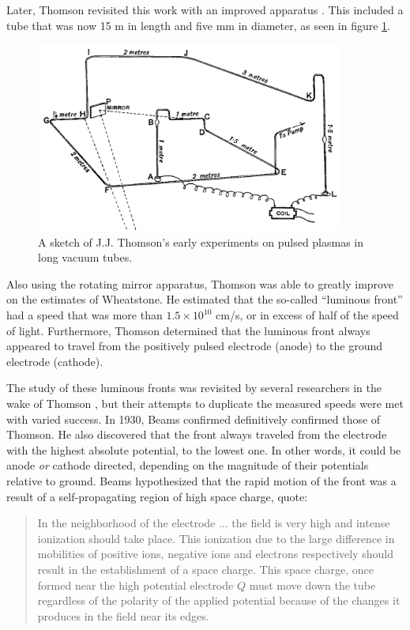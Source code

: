 Later, Thomson revisited this work with an improved apparatus
\cite{Thomson1893}. This included a tube that was now 15 m in length and five mm
in diameter, as seen in figure \ref{fig:thomson}.
\begin{figure}
  \centering
  \includegraphics[width=4in]{chapters/introduction/figures/thomson.png}
  \caption{A sketch of J.J. Thomson's early experiments on pulsed plasmas 
  in long vacuum tubes.}\label{fig:thomson}
\end{figure}
Also using the rotating mirror apparatus, Thomson was able to greatly improve on
the estimates of Wheatstone. He estimated that the so-called ``luminous front''
had a speed that was more than $1.5\times10^{10}$ cm/s, or in excess of half of
the speed of light. Furthermore, Thomson determined that the luminous front
always appeared to travel from the positively pulsed electrode (anode) to the
ground electrode (cathode).

The study of these luminous fronts was revisited by several researchers in the
wake of Thomson \cite{James1904, Whiddington1925, Beams1926}, but their attempts
to duplicate the measured speeds were met with varied success. In 1930, Beams
confirmed definitively confirmed those of Thomson. He also discovered that the
front always traveled from the electrode with the highest absolute potential, to
the lowest one. In other words, it could be anode \emph{or} cathode directed,
depending on the magnitude of their potentials relative to ground. Beams
hypothesized that the rapid motion of the front was a result of a
self-propagating region of high space charge, quote:
\begin{quote}
  In the neighborhood of the electrode $\ldots{}$ the field is very high and
  intense ionization should take place. This ionization due to the large
  difference in mobilities of positive ions, negative ions and electrons
  respectively should result in the establishment of a space charge. This space
  charge, once formed near the high potential electrode $Q$ must move down the
  tube regardless of the polarity of the applied potential because of the
  changes it produces in the field near its edges.
\end{quote}

